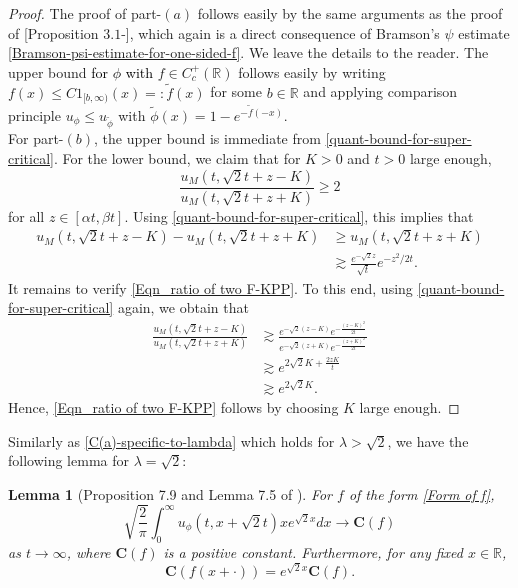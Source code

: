 \documentclass[a4paper,reqno]{amsart}%
\newcommand{\Cb}{\mathbf{C}}
\newcommand{\1}{\mathbf 1}
\theoremstyle{mine}
\numberwithin{theorem}{section}
\newtheorem{lemma}[theorem]{Lemma}
\numberwithin{equation}{section}
\theoremstyle{remark}
\begin{document}
\begin{proof}
The proof of part-$(a)$ follows easily by the same arguments as the proof of [Proposition $3.1$-\cite{bovier2014extremal}], which again is a direct consequence of Bramson's $\psi$ estimate \eqref{Bramson-psi-estimate-for-one-sided-f}. We leave the details to the reader. The upper bound \textcolor{black}{for $\phi$ with} $f\in C_c^+(\mathbb{R})$ follows easily by writing $f(x) \leq C 1_{[b,\infty)}(x)=: \widetilde{f}(x)$ for some $b\in \mathbb{R}$ and applying comparison principle $u_\phi \leq u_{\widetilde{\phi}}$ with $\widetilde{\phi}(x) =1-e^{-\widetilde{f}(-x)}$. \\
For part-$(b)$, the upper bound is immediate from \eqref{quant-bound-for-super-critical}. For the lower bound, we claim that for $K>0$ and $t>0$ large enough, 
     \begin{equation}\label{Eqn_ratio of two F-KPP}
         \frac{u_M(t,\sqrt 2t+z-K)}{u_M(t,\sqrt 2t+z+K)} \ge 2
     \end{equation}
for all $z\in [\alpha t, \beta t]$. Using \eqref{quant-bound-for-super-critical}, this implies that
     \begin{align*}
          u_M(t,\sqrt 2t+z-K)-u_M(t,\sqrt 2t+z+K) &\ge u_M(t,\sqrt 2t+z+K) \\
          & \gtrsim \frac{e^{-\sqrt 2 z}}{\sqrt t}e^{-z^2/2t}.
     \end{align*}
     It remains to verify \eqref{Eqn_ratio of two F-KPP}.
     To this end, using \eqref{quant-bound-for-super-critical} again, we obtain that
     \begin{align*}
          \frac{u_M(t,\sqrt 2t+z-K)}{u_M(t,\sqrt 2t+z + K)} &\gtrsim \frac{e^{-\sqrt 2(z-K)}e^{-\frac{(z-K)^2}{2t}}}{e^{-\sqrt 2(z+K)}e^{-\frac{(z+K)^2}{2t}}} \\
          & \gtrsim e^{2\sqrt 2K+\frac{2zK}{t}} \\& 
          \gtrsim e^{2\sqrt 2K}.
     \end{align*}
     Hence, \eqref{Eqn_ratio of two F-KPP} follows by choosing $K$ large enough. 
\end{proof}


Similarly as \eqref{C(a)-specific-to-lambda} which holds for $\lambda >\sqrt{2}$, we have the following lemma for $\lambda = \sqrt{2}$:


\begin{lemma}[Proposition 7.9 and Lemma 7.5 of \cite{Bovier_book}] \label{C-for-critical-def}
For $f$ of the form \eqref{Form of f}, 
\begin{equation}\label{constant-f}
\sqrt{\frac{2}{\pi}}\int_0^\infty u_\phi(t, x+\sqrt{2}t)xe^{\sqrt{2} x} dx \to \Cb(f)
\end{equation}
as $t\to \infty$, where $\Cb(f)$ is a positive constant. Furthermore, for any fixed $x \in \mathbb{R}$, 
\begin{equation}\label{C-shift}
\Cb(f(x+ \cdot)) = e^{\sqrt{2}x}\Cb(f).
\end{equation} 
\end{lemma}
\end{document}

